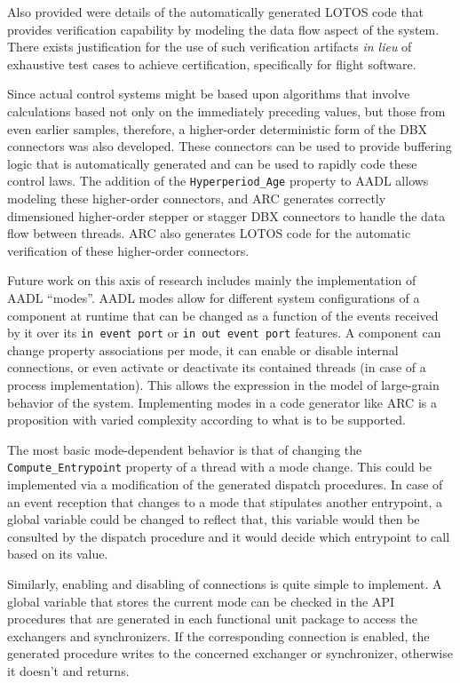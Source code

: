 Also provided were details of the automatically generated LOTOS code
that provides verification capability by modeling the data flow aspect
of the system. There exists justification for the use of such
verification artifacts \emph{in lieu} of exhaustive test cases to
achieve certification, specifically for flight software.

Since actual control systems might be based upon algorithms that
involve calculations based not only on the immediately preceding
values, but those from even earlier samples, therefore, a higher-order
deterministic form of the DBX connectors was also developed. These
connectors can be used to provide buffering logic that is
automatically generated and can be used to rapidly code these control
laws. The addition of the \texttt{Hyperperiod\_Age} property to AADL
allows modeling these higher-order connectors, and ARC generates
correctly dimensioned higher-order stepper or stagger DBX connectors
to handle the data flow between threads. ARC also generates LOTOS code
for the automatic verification of these higher-order connectors.

Future work on this axis of research includes mainly the
implementation of AADL ``modes''. AADL modes allow for different
system configurations of a component at runtime that can be changed as
a function of the events received by it over its \texttt{in event port}
or \texttt{in out event port} features. A component can change
property associations per mode, it can enable or disable internal
connections, or even activate or deactivate its contained threads (in
case of a process implementation). This allows the expression in the
model of large-grain behavior of the system. Implementing modes in
a code generator like ARC is a proposition with varied complexity
according to what is to be supported.

The most basic mode-dependent behavior is that of changing the
\texttt{Compute\_Entrypoint} property of a thread with a mode
change. This could be implemented via a modification of the generated
dispatch procedures. In case of an event reception that changes to a
mode that stipulates another entrypoint, a global variable could be
changed to reflect that, this variable would then be consulted by the
dispatch procedure and it would decide which entrypoint to call based
on its value.

Similarly, enabling and disabling of connections is quite simple to
implement. A global variable that stores the current mode can be
checked in the API procedures that are generated in each functional
unit package to access the exchangers and synchronizers. If the
corresponding connection is enabled, the generated procedure writes to
the concerned exchanger or synchronizer, otherwise it doesn't and
returns.

